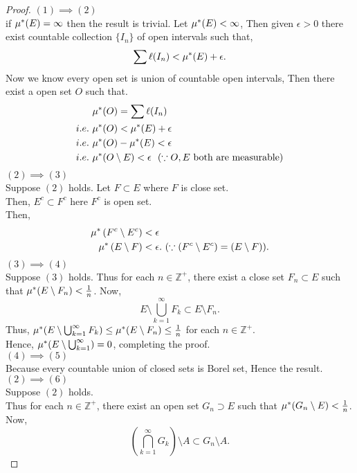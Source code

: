 \begin{proof}
    \textbf{$(1)\implies(2)$}\\
    if $\mu^{*}(E)=\infty$ then the result is trivial.
    Let $\mu^{*}(E)<\infty$, Then given $\epsilon>0$ there exist countable collection  $\{I_n\}$ of open intervals such that,
     \[
        \sum\ell(I_n)< \mu^{*}(E)+\epsilon.
    \]
    Now we know every open set is union of countable open intervals, Then there exist a open set $O$ such that.
    \begin{align*}
        &\smu(O)=\sum\ell(I_n)\\
        i.e.\ &\smu(O)< \smu(E)+\epsilon\\
        i.e.\ &\smu(O)-\smu(E)<\epsilon\\
        i.e.\ &\smu(O\setminus E)<\epsilon\ \ (\because O,E\ \text{both are measurable})
    \end{align*}
    \textbf{$(2)\implies(3)$}\\
    Suppose $(2)$ holds.
    Let $F\subset E$ where  $F$ is close set.\\
    Then,  $E^{c}\subset F^{c}$ here $F^{c}$ is open set.\\
    Then, 
    \begin{align*}
        \mu^{*}\left( F^{c}\setminus E^{c} \right)&<\epsilon\\
        \mu^{*}\left( E\setminus F \right) &<\epsilon. \ (\because (F^{c}\setminus E^{c})=(E\setminus F)).
    \end{align*}
    \textbf{$(3)\implies(4)$}\\ 
    Suppose $(3)$ holds. Thus for each $n\in\mathds{Z}^{+}$, there exist a close set $F_n\subset E$ such that  $\mu^{*}(E\setminus F_n)<\frac{1}{n}$. Now,
    \[
        E\setminus \bigcup_{k=1}^{\infty}F_k\subset E\setminus F_n.
    \]
    Thus, $\mu^{*}(E\setminus \bigcup_{k=1}^{\infty}F_k)\le \mu^{*}(E\setminus F_n)\le \frac{1}{n}$ for each $n\in\mathds{Z}^{+}$.\\
    Hence, $\mu^{*}(E\setminus \bigcup_{k=1}^{\infty})=0$, completing the proof.\\
    \textbf{$(4)\implies(5)$}\\
    Because every countable union of closed sets is Borel set, Hence the result.\\
    \textbf{$(2)\implies(6)$}\\ 
    Suppose $(2)$ holds.\\ Thus for each  $n\in\mathds{Z}^{+}$, there exist an open set $G_n\supset E$ such that  $\mu^{*}(G_n\setminus E)<\frac{1}{n}$. Now,
    \[
        \left( \bigcap_{k=1}^{\infty}G_k \right)\setminus A\subset G_n\setminus A. 
\]
\end{proof}
